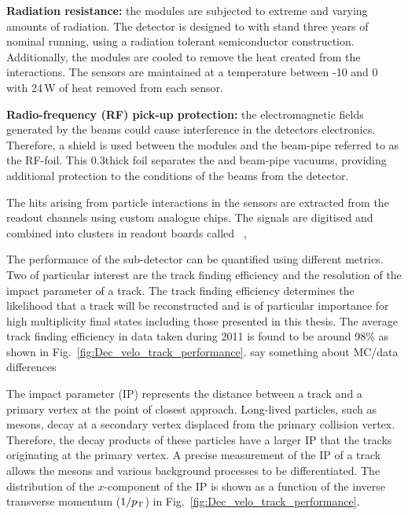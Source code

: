 \begin{description}   
\item \textbf{Radiation resistance:} the \velo modules are subjected to extreme and varying amounts of radiation. The detector is designed to with stand three years of nominal \lhc running, using a radiation tolerant semiconductor construction. Additionally, the \velo modules are cooled to remove the heat created from the interactions. The sensors are maintained at a temperature between -10 and 0 with 24\,W of heat removed from each sensor.  
\item \textbf{Radio-frequency (RF) pick-up protection:} the electromagnetic fields generated by the \lhc beams could cause interference in the \velo detectors electronics. Therefore, a shield is used between the modules and the beam-pipe referred to as the RF-foil. This 0.3\mm thick foil separates the \velo and beam-pipe vacuums, providing additional protection to the conditions of the beams from the detector.
\end{description}   

The hits arising from particle interactions in the \velo sensors are extracted from the readout channels using custom analogue chips. The signals are digitised and combined into clusters in readout boards called \tellone~\cite{HAEFELI2006494}, 


The performance of the \velo sub-detector can be quantified using different metrics. Two of particular interest are the track finding efficiency and the resolution of the impact parameter of a track. 
The track finding efficiency determines the likelihood that a track will be reconstructed and is of particular importance for high multiplicity final states including those presented in this thesis. The average track finding efficiency in data taken during 2011 is found to be around 98\% as shown in Fig.~\ref{fig:Dec_velo_track_performance}. {\color{Red} say something about MC/data differences}

The impact parameter (IP) represents the distance between a track and a primary vertex at the point of closest approach. Long-lived particles, such as \Bp mesons, decay at a secondary vertex displaced from the primary collision vertex. Therefore, the decay products of these particles have a larger IP that the tracks originating at the primary vertex. A precise measurement of the IP of a track allows the \Bp mesons and various background processes to be differentiated. The distribution of the $x$-component of the IP is shown as a function of the inverse transverse momentum ($1/\mbox{$p_{\mathrm{ T}}$}$) in Fig.~\ref{fig:Dec_velo_track_performance}.  


